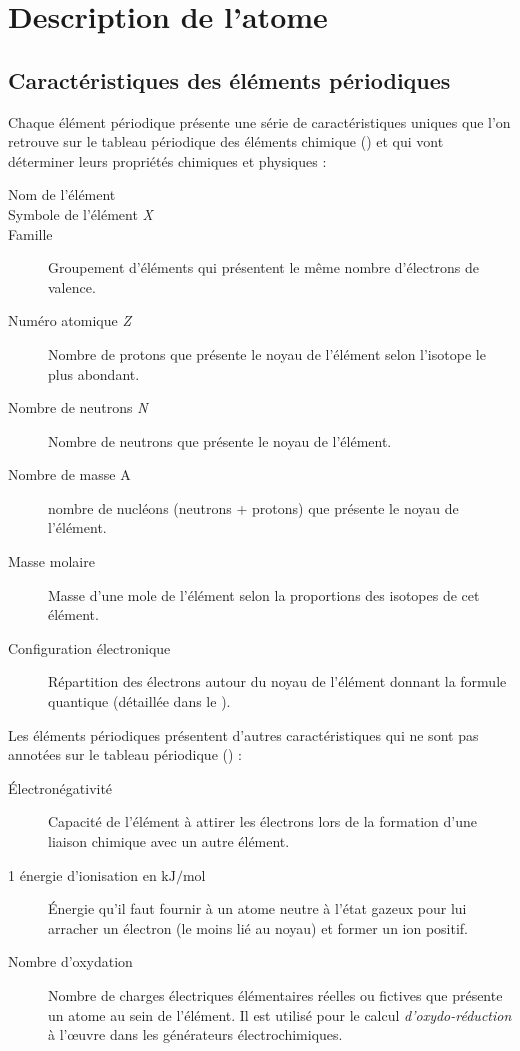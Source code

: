 \section{Description de l'atome}

\subsection{Caractéristiques des éléments périodiques}

Chaque élément périodique présente une série de caractéristiques uniques que l'on retrouve sur le tableau périodique des éléments chimique () et qui vont déterminer leurs propriétés chimiques et physiques :
\begin{description}
	\item[Nom de l'élément]
	\item[Symbole de l'élément \emph{X}]
	\item[Famille] Groupement d'éléments qui présentent le même nombre d'électrons de valence.
	\item[Numéro atomique \emph{Z}] Nombre de protons que présente le noyau de l'élément selon l'isotope le plus abondant.
	\item[Nombre de neutrons \emph{N}] Nombre de neutrons que présente le noyau de l'élément.
	\item[Nombre de masse A] nombre de nucléons (neutrons + protons) que présente le noyau de l'élément.
	\item[Masse molaire] Masse d'une mole de l'élément selon la proportions des isotopes de cet élément.
	\item[Configuration électronique] Répartition des électrons autour du noyau de l'élément donnant la formule quantique (détaillée dans le ).
\end{description}

\pagebreak

Les éléments périodiques présentent d'autres caractéristiques qui ne sont pas annotées sur le tableau périodique () :
\begin{description}
	\item[\'Electronégativité] Capacité de l'élément à attirer les électrons lors de la formation d'une liaison chimique avec un autre élément.
	\item[1\iere{} énergie d'ionisation en $\si{\kilo\joule\per\mol}$] \'Energie qu'il faut fournir à un atome neutre à l'état gazeux pour lui arracher un électron (le moins lié au noyau) et former un ion positif.
	\item[Nombre d'oxydation] Nombre de charges électriques élémentaires réelles ou fictives que présente un atome au sein de l'élément. Il est utilisé pour le calcul \emph{d'oxydo-réduction} à l'\oe{}uvre dans les générateurs électrochimiques.
\end{description}

